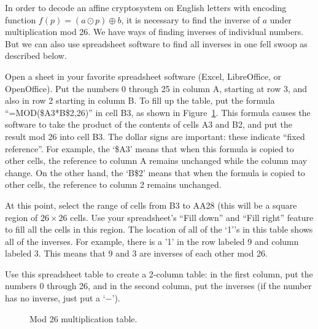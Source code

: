 \begin{exercise}{}
In order to decode an affine cryptosystem on English letters with encoding function $f(p) = (a\odot p) \oplus b$, it is necessary to find the inverse of $a$ under multiplication mod 26. We have ways of finding inverses of individual numbers.  But we can also use spreadsheet software  to find all inverses in one fell swoop as described below.

Open a sheet in  your favorite spreadsheet software (Excel, LibreOffice, or OpenOffice). Put the numbers 0 through 25 in column A, starting at row 3, and also in row 2 starting in column B. To fill up the table, put the formula ``=MOD(\$A3*B\$2,26)'' in cell B3, as shown in Figure~\ref{fig:mod26mult}. This formula causes the software to take the product of the contents of cells A3 and B2, and put the result mod 26 into cell B3.  The dollar signs are important: these indicate ``fixed reference''.  For example, the `\$A3' means that when this formula is copied to other cells, the reference to column A remains unchanged while the column may change. On the other hand, the `B\$2' means that when the formula is copied to other cells, the reference to column 2 remains unchanged.

At this point, select the range of cells from B3 to AA28 (this will be a  square region of $26 \times 26$ cells. Use your spreadsheet's ``Fill down'' and ``Fill right'' feature to fill all the cells in this region. The location of all of the `1''s in this table shows all of the inverses.  For example, there is a '1' in the row labeled 9 and column labeled 3.  This means that 9 and 3 are inverses of each other mod 26.

Use this spreadsheet table to create a 2-column table: in the first column, put the numbers 0 through 26, and in the second column, put the inverses (if the number has no inverse, just put a `$-$').
\begin{figure}[h]
\caption{Mod 26 multiplication table.}
\label{fig:mod26mult}
\end{figure}
\end{exercise}

